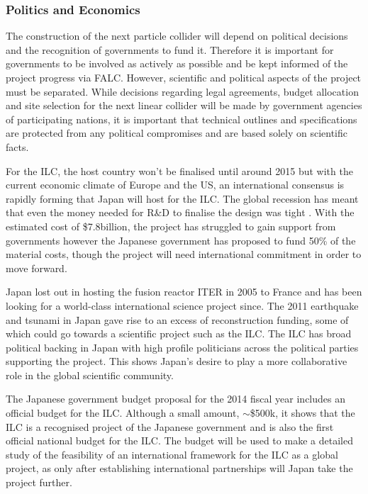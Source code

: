  
\subsubsection{Politics and Economics}

The construction of the next particle collider will depend on political decisions and the recognition of governments to fund it. Therefore it is important for governments to be involved as actively as possible and be kept informed of the project progress via FALC. However, scientific and political aspects of the project must be separated. While decisions regarding legal agreements, budget allocation and site selection for the next linear collider will be made by government agencies of participating nations, it is important that technical outlines and specifications are protected from any political compromises and are based solely on scientific facts. \cite{ILC:PIPReport}

For the ILC, the host country won't be finalised until around 2015 but with the current economic climate of Europe and the US, an international consensus is rapidly forming that Japan will host for the ILC. The global recession has meant that even the money needed for R\&D to finalise the design was tight \cite{Funding:Nature}.  With the estimated cost of \$7.8billion, the project has struggled to gain support from governments however the Japanese government has proposed to fund 50\% of the material costs, though the project will need international commitment in order to move forward.

Japan lost out in hosting the fusion reactor ITER in 2005 to France and has been looking for a world-class international science project since. The 2011 earthquake and tsunami in Japan gave rise to an excess of reconstruction funding, some of which could go towards a scientific project such as the ILC. The ILC has broad political backing in Japan with high profile politicians across the political parties supporting the project. This shows Japan's desire to play a more collaborative role in the global scientific community. \cite{Funding:NaturePress1}

The Japanese government budget proposal for the 2014 fiscal year includes an official budget for the ILC. Although a small amount,   $\sim$\$500k, it shows that the ILC is a recognised project of the Japanese government and is also the first official national budget for the ILC. The budget will be used to make a detailed study of the feasibility of an international framework for the ILC as a global project, as only after establishing international partnerships will Japan take the project further. \cite{LCC:Press4}
 
